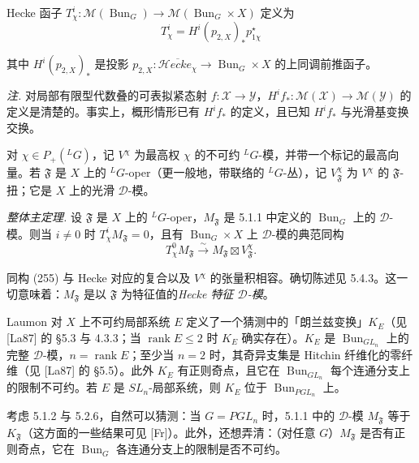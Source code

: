 Hecke 函子 $T_\chi^i:\mathcal{M}(\operatorname{Bun}_G)\to\mathcal{M}(\operatorname{Bun}_G\times X)$ 定义为
\begin{equation}\tag{254}
T_\chi^i=H^i(p_{2,X})_*p_{1\chi}^\star
\end{equation}


其中 $H^i(p_{2,X})_*$ 是投影 $p_{2,X}:\overline{\mathcal{H}ecke_\chi}\to\operatorname{Bun}_G\times X$ 的上同调前推函子。

\emph{注.} 对局部有限型代数叠的可表拟紧态射 $f:\mathcal{X}\to\mathcal{Y}$，$H^if_*:\mathcal{M}(\mathcal{X})\to\mathcal{M}(\mathcal{Y})$ 的定义是清楚的。事实上，概形情形已有 $H^if_*$ 的定义，且已知 $H^if_*$ 与光滑基变换交换。

 对 $\chi\in P_+({}^{L}G)$，记 $V^\chi$ 为最高权 $\chi$ 的不可约 ${}^{L}G$-模，并带一个标记的最高向量。若 $\mathfrak{F}$ 是 $X$ 上的 ${}^{L}G$-oper（更一般地，带联络的 ${}^{L}G$-丛），记 $V^\chi_{\mathfrak{F}}$ 为 $V^\chi$ 的 $\mathfrak{F}$-扭；它是 $X$ 上的光滑 $\mathcal{D}$-模。

 \emph{整体主定理.} 设 $\mathfrak{F}$ 是 $X$ 上的 ${}^{L}G$-oper，$M_{\mathfrak{F}}$ 是 5.1.1 中定义的 $\operatorname{Bun}_G$ 上的 $\mathcal{D}$-模。则当 $i\ne 0$ 时 $T_\chi^iM_{\mathfrak{F}}=0$，且有 $\operatorname{Bun}_G\times X$ 上 $\mathcal{D}$-模的典范同构
\begin{equation}\tag{255}
T_\chi^0M_{\mathfrak{F}}\xrightarrow{\sim}M_{\mathfrak{F}}\boxtimes V^\chi_{\mathfrak{F}}.
\end{equation}

同构 (255) 与 Hecke 对应的复合以及 $V^\chi$ 的张量积相容。确切陈述见 5.4.3。这一切意味着：$M_{\mathfrak{F}}$ 是以 $\mathfrak{F}$ 为特征值的\emph{Hecke 特征 $\mathcal{D}$-模}。

 Laumon 对 $X$ 上不可约局部系统 $E$ 定义了一个猜测中的「朗兰兹变换」$K_E$（见 [La87] 的 §5.3 与 4.3.3；当 $\operatorname{rank}E\le 2$ 时 $K_E$ 确实存在）。$K_E$ 是 $\operatorname{Bun}_{GL_n}$ 上的完整 $\mathcal{D}$-模，$n=\operatorname{rank}E$；至少当 $n=2$ 时，其奇异支集是 Hitchin 纤维化的零纤维（见 [La87] 的 §5.5）。此外 $K_E$ 有正则奇点，且它在 $\operatorname{Bun}_{GL_n}$ 每个连通分支上的限制不可约。若 $E$ 是 $SL_n$-局部系统，则 $K_E$ 位于 $\operatorname{Bun}_{PGL_n}$ 上。

考虑 5.1.2 与 5.2.6，自然可以猜测：当 $G=PGL_n$ 时，5.1.1 中的 $\mathcal{D}$-模 $M_{\mathfrak{F}}$ 等于 $K_{\mathfrak{F}}$（这方面的一些结果可见 [Fr]）。此外，还想弄清：（对任意 $G$）$M_{\mathfrak{F}}$ 是否有正则奇点，它在 $\operatorname{Bun}_G$ 各连通分支上的限制是否不可约。

